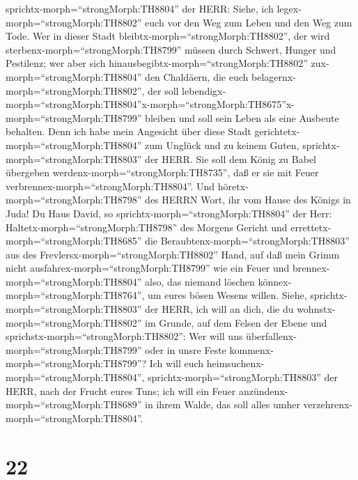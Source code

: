 sprichtx-morph=``strongMorph:TH8804'' der HERR: Siehe, ich
legex-morph=``strongMorph:TH8802'' euch vor den Weg zum Leben und den
Weg zum Tode.  Wer in dieser Stadt
bleibtx-morph=``strongMorph:TH8802'', der wird
sterbenx-morph=``strongMorph:TH8799'' müssen durch Schwert, Hunger und
Pestilenz; wer aber sich hinausbegibtx-morph=``strongMorph:TH8802''
zux-morph=``strongMorph:TH8804'' den Chaldäern, die euch
belagernx-morph=``strongMorph:TH8802'', der soll
lebendigx-morph=``strongMorph:TH8804''\textbar x-morph=``strongMorph:TH8675''x-morph=``strongMorph:TH8799''
bleiben und soll sein Leben als eine Ausbeute behalten. 
Denn ich habe mein Angesicht über diese Stadt
gerichtetx-morph=``strongMorph:TH8804'' zum Unglück und zu keinem Guten,
sprichtx-morph=``strongMorph:TH8803'' der HERR. Sie soll dem König zu
Babel übergeben werdenx-morph=``strongMorph:TH8735'', daß er sie mit
Feuer verbrennex-morph=``strongMorph:TH8804''.  Und
höretx-morph=``strongMorph:TH8798'' des HERRN Wort, ihr vom Hause des
Königs in Juda!  Du Haus David, so
sprichtx-morph=``strongMorph:TH8804'' der Herr:
Haltetx-morph=``strongMorph:TH8798'' des Morgens Gericht und
errettetx-morph=``strongMorph:TH8685'' die
Beraubtenx-morph=``strongMorph:TH8803'' aus des
Frevlersx-morph=``strongMorph:TH8802'' Hand, auf daß mein Grimm nicht
ausfahrex-morph=``strongMorph:TH8799'' wie ein Feuer und
brennex-morph=``strongMorph:TH8804'' also, das niemand löschen
könnex-morph=``strongMorph:TH8764'', um eures bösen Wesens willen.
 Siehe, sprichtx-morph=``strongMorph:TH8803'' der HERR, ich
will an dich, die du wohnstx-morph=``strongMorph:TH8802'' im Grunde, auf
dem Felsen der Ebene und sprichstx-morph=``strongMorph:TH8802'': Wer
will uns überfallenx-morph=``strongMorph:TH8799'' oder in unsre Feste
kommenx-morph=``strongMorph:TH8799''?  Ich will euch
heimsuchenx-morph=``strongMorph:TH8804'',
sprichtx-morph=``strongMorph:TH8803'' der HERR, nach der Frucht eures
Tuns; ich will ein Feuer anzündenx-morph=``strongMorph:TH8689'' in ihrem
Walde, das soll alles umher verzehrenx-morph=``strongMorph:TH8804''.

\hypertarget{section-21}{%
\section{22}\label{section-21}}

